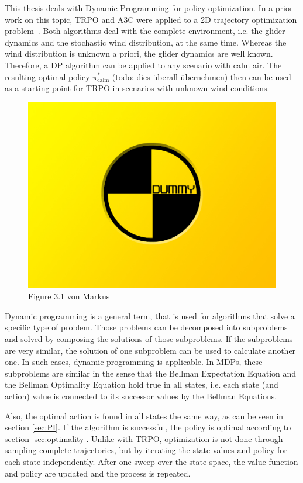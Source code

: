This thesis deals with Dynamic Programming for policy optimization. In a prior work on this topic, TRPO and A3C were applied to a 2D trajectory optimization problem~\cite{Zuern2017}. Both algorithms deal with the complete environment, i.e. the glider dynamics and the stochastic wind distribution, at the same time. Whereas the wind distribution is unknown a priori, the glider dynamics are well known. Therefore, a DP algorithm can be applied to any scenario with calm air. The resulting optimal policy $\pi^*_{\text{calm}}$ (todo: dies überall übernehmen) then can be used as a starting point for TRPO in scenarios with unknown wind conditions.

\begin{figure}[h]
	\includegraphics[width=\textwidth]{src/pics/dummy.jpg}
	\caption{Figure 3.1 von Markus}
	\label{fig:RLmethods} 
\end{figure}

Dynamic programming is a general term, that is used for algorithms that solve a specific type of problem. Those problems can be decomposed into subproblems and solved by composing the solutions of those subproblems. If the subproblems are very similar, the solution of one subproblem can be used to calculate another one. In such cases, dynamic programming is applicable. In MDPs, these subproblems are similar in the sense that the Bellman Expectation Equation and the Bellman Optimality Equation hold true in all states, i.e. each state (and action) value is connected to its successor values by the Bellman Equations.

Also, the optimal action is found in all states the same way, as can be seen in section \ref{sec:PI}. If the algorithm is successful, the policy is optimal according to section \ref{sec:optimality}. Unlike with TRPO, optimization is not done through sampling complete trajectories, but by iterating the state-values and policy for each state independently. After one sweep over the state space, the value function and policy are updated and the process is repeated.\bigbreak

